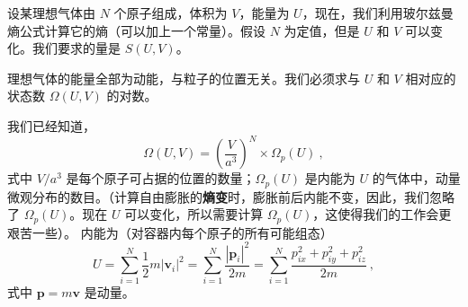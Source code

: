 

设某理想气体由 $N $ 个原子组成，体积为 $V$，能量为 $U$，现在，我们利用玻尔兹曼熵公式计算它的熵（可以加上一个常量）。假设 $N $ 为定值，但是 $U $ 和 $V $ 可以变化。我们要求的量是 $S(U,V)$。

理想气体的能量全部为动能，与粒子的位置无关。我们必须求与 $U$ 和 $V$ 相对应的状态数 $\Omega(U,V)$ 的对数。

我们已经知道，
\begin{equation}
\Omega \left( U,V \right) =\left( \frac{V}{a^3} \right) ^N\times \Omega _p\left( U \right) ~,
\end{equation}
式中 $V/a^3$ 是每个原子可占据的位置的数量；$\Omega_p(U)$ 是内能为 $U$ 的气体中，动量微观分布的数目。（计算自由膨胀的\textbf{熵变}时，膨胀前后内能不变，因此，我们忽略了 $\Omega_p(U)$。现在 $U$ 可以变化，所以需要计算 $\Omega_p(U)$，这使得我们的工作会更艰苦一些）。
内能为（对容器内每个原子的所有可能组态）
\begin{equation}
U=\sum_{i=1}^N{\frac{1}{2}m\left| \boldsymbol{v}_i \right|^2}=\sum_{i=1}^N{\frac{\left| \boldsymbol{p}_i \right|^2}{2m}}=\sum_{i=1}^N{\frac{p_{ix}^{2}+p_{iy}^{2}+p_{iz}^{2}}{2m}}~,
\end{equation}
式中 $\boldsymbol p = m\boldsymbol v$ 是动量。

